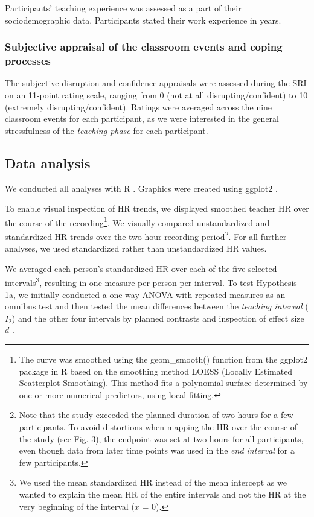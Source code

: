 \documentclass[preprint, 3p,
sort,]{elsarticle} %
\begin{document}
Participants' teaching experience was assessed as a part of their
sociodemographic data. Participants stated their work experience in
years.

\subsubsection{Subjective appraisal of the classroom events and coping
processes}\label{subjective-appraisal-of-the-classroom-events-and-coping-processes}

The subjective disruption and confidence appraisals were assessed during
the SRI on an 11-point rating scale, ranging from 0 (not at all
disrupting/confident) to 10 (extremely disrupting/confident). Ratings
were averaged across the nine classroom events for each participant, as
we were interested in the general stressfulness of the \emph{teaching
phase} for each participant.

\subsection{Data analysis}\label{data-analysis}

We conducted all analyses with R \citep{RStudio2020}. Graphics were
created using ggplot2 \citep{ggplot2}.

To enable visual inspection of HR trends, we displayed smoothed teacher
HR over the course of the recording\footnote{The curve was smoothed
  using the geom\_smooth() function from the ggplot2 package in R
  \citep{ggplot2} based on the smoothing method LOESS (Locally Estimated
  Scatterplot Smoothing). This method fits a polynomial surface
  determined by one or more numerical predictors, using local fitting.}.
We visually compared unstandardized and standardized HR trends over the
two-hour recording period\footnote{Note that the study exceeded the
  planned duration of two hours for a few participants. To avoid
  distortions when mapping the HR over the course of the study (see Fig.
  3), the endpoint was set at two hours for all participants, even
  though data from later time points was used in the \emph{end interval}
  for a few participants.}. For all further analyses, we used
standardized rather than unstandardized HR values.

We averaged each person's standardized HR over each of the five selected
intervals\footnote{We used the mean standardized HR instead of the mean
  intercept as we wanted to explain the mean HR of the entire intervals
  and not the HR at the very beginning of the interval (\(x\) = 0).},
resulting in one measure per person per interval. To test Hypothesis 1a,
we initially conducted a one-way ANOVA with repeated measures as an
omnibus test and then tested the mean differences between the
\emph{teaching interval} (\(I_2\)) and the other four intervals by
planned contrasts and inspection of effect size \(d\)
\citep{cohen1988statistical}.
\end{document}
